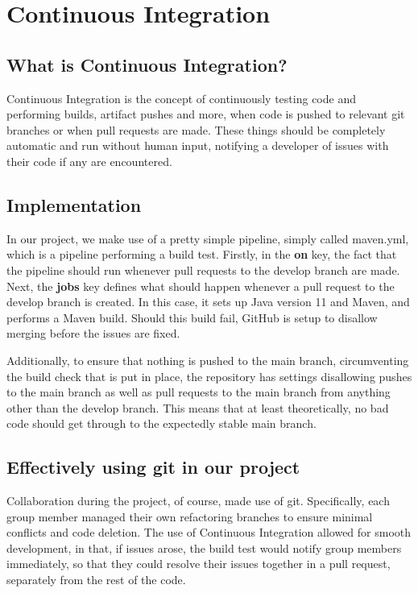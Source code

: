 
\section{Continuous Integration}
\subsection{What is Continuous Integration?}
Continuous Integration is the concept of continuously testing code and performing builds, artifact pushes and more, when code is pushed to relevant git branches or when pull requests are made. These things should be completely automatic and run without human input, notifying a developer of issues with their code if any are encountered.
\subsection{Implementation}
In our project, we make use of a pretty simple pipeline, simply called maven.yml, which is a pipeline performing a build test. Firstly, in the \textbf{on} key, the fact that the pipeline should run whenever pull requests to the develop branch are made. Next, the \textbf{jobs} key defines what should happen whenever a pull request to the develop branch is created. In this case, it sets up Java version 11 and Maven, and performs a Maven build. Should this build fail, GitHub is setup to disallow merging before the issues are fixed.

Additionally, to ensure that nothing is pushed to the main branch, circumventing the build check that is put in place, the repository has settings disallowing pushes to the main branch as well as pull requests to the main branch from anything other than the develop branch. This means that at least theoretically, no bad code should get through to the expectedly stable main branch.

\subsection{Effectively using git in our project}
Collaboration during the project, of course, made use of git. Specifically, each group member managed their own refactoring branches to ensure minimal conflicts and code deletion. The use of Continuous Integration allowed for smooth development, in that, if issues arose, the build test would notify group members immediately, so that they could resolve their issues together in a pull request, separately from the rest of the code.
